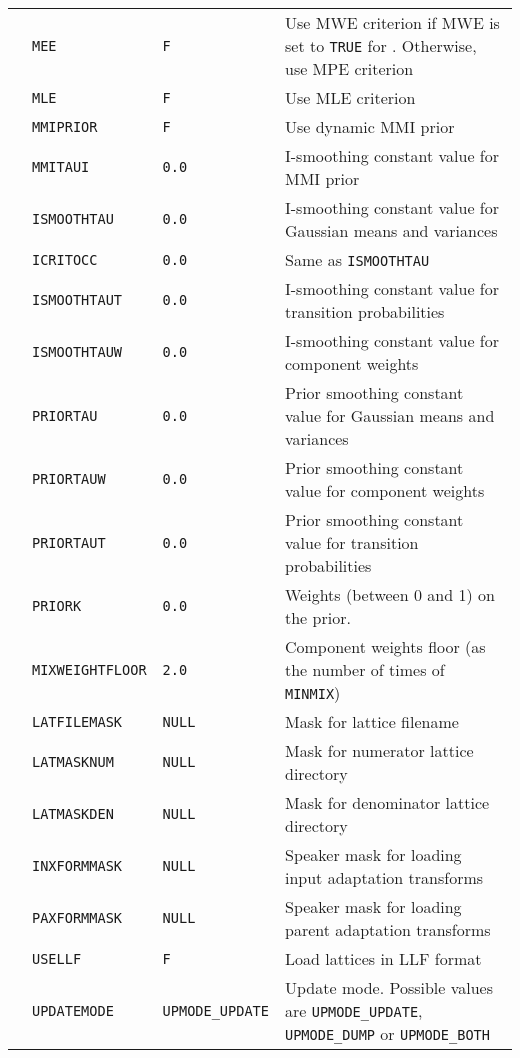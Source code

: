 \begin{center}
\begin{supertabular}{|p{1.8cm}|l|l|p{6.6cm}|}
& \texttt{MEE} & \texttt{F} & Use MWE criterion if MWE is set to \texttt{TRUE} for . Otherwise, use MPE criterion \\ 
& \texttt{MLE} & \texttt{F} & Use MLE criterion \\ 
& \texttt{MMIPRIOR} & \texttt{F} & Use dynamic MMI prior \\ 
& \texttt{MMITAUI} & \texttt{0.0} & I-smoothing constant value for MMI prior \\ 
& \texttt{ISMOOTHTAU} & \texttt{0.0} & I-smoothing constant value for Gaussian means and variances \\ 
& \texttt{ICRITOCC} & \texttt{0.0} & Same as \texttt{ISMOOTHTAU} \\ 
& \texttt{ISMOOTHTAUT} & \texttt{0.0} & I-smoothing constant value for transition probabilities \\ 
& \texttt{ISMOOTHTAUW} & \texttt{0.0} & I-smoothing constant value for component weights \\ 
& \texttt{PRIORTAU} & \texttt{0.0} & Prior smoothing constant value for Gaussian means and variances \\ 
& \texttt{PRIORTAUW} & \texttt{0.0} & Prior smoothing constant value for component weights \\ 
& \texttt{PRIORTAUT} & \texttt{0.0} & Prior smoothing constant value for transition probabilities \\ 
& \texttt{PRIORK} & \texttt{0.0} & Weights (between 0 and 1) on the prior. \\ 
& \texttt{MIXWEIGHTFLOOR} & \texttt{2.0} & Component weights floor (as the number of times of \texttt{MINMIX}) \\ 
& \texttt{LATFILEMASK} & \texttt{NULL} & Mask for lattice filename \\ 
& \texttt{LATMASKNUM} & \texttt{NULL} & Mask for numerator lattice directory \\ 
& \texttt{LATMASKDEN} & \texttt{NULL} & Mask for denominator lattice directory \\ 
& \texttt{INXFORMMASK} & \texttt{NULL} & Speaker mask for loading input adaptation transforms \\ 
& \texttt{PAXFORMMASK} & \texttt{NULL} & Speaker mask for loading parent adaptation transforms \\ 
& \texttt{USELLF} & \texttt{F} & Load lattices in LLF format \\ 
& \texttt{UPDATEMODE} & \texttt{UPMODE\_UPDATE} & Update mode. Possible values are \texttt{UPMODE\_UPDATE}, \texttt{UPMODE\_DUMP} or \texttt{UPMODE\_BOTH}\\ \hline


\end{supertabular}
\end{center}
